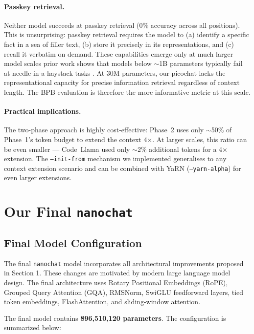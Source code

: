 \documentclass[a4paper,12pt]{article}
\begin{document}
\paragraph{Passkey retrieval.}
Neither model succeeds at passkey retrieval (0\% accuracy across all positions).
This is unsurprising: passkey retrieval requires the model to (a) identify
a specific fact in a sea of filler text, (b) store it precisely in its
representations, and (c) recall it verbatim on demand.  These capabilities
emerge only at much larger model scales prior work shows that models below
$\sim$1B parameters typically fail at needle-in-a-haystack tasks
\cite{roziere2023codellama}.  At 30M parameters, our picochat lacks the
representational capacity for precise information retrieval regardless of
context length.  The BPB evaluation is therefore the more informative metric
at this scale.

\paragraph{Practical implications.}
The two-phase approach is highly cost-effective: Phase~2 uses only
$\sim$50\% of Phase~1's token budget to extend the context 4$\times$.
At larger scales, this ratio can be even smaller — Code~Llama used
only $\sim$2\% additional tokens for a 4$\times$ extension.  The
\texttt{--init-from} mechanism we implemented generalises to any
context extension scenario and can be combined with YaRN
(\texttt{--yarn-alpha}) for even larger extensions.

\newpage

\section{Our Final \texttt{nanochat}}

\subsection{Final Model Configuration}

The final \texttt{nanochat} model incorporates all architectural improvements proposed in Section 1. These changes are motivated by modern large language model design. The final architecture uses Rotary Positional Embeddings (RoPE), Grouped Query Attention (GQA), RMSNorm, SwiGLU feedforward layers, tied token embeddings, FlashAttention, and sliding-window attention.

The final model contains \textbf{896,510,120 parameters}. The configuration is summarized below:
\end{document}
